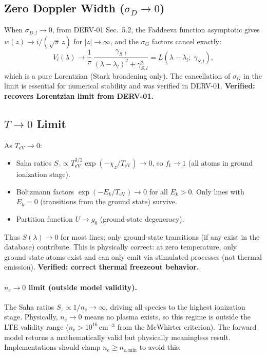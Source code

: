 \documentclass[11pt]{article}
\newcommand{\TeV}{T_\mathrm{eV}}
\newcommand{\ne}{n_\mathrm{e}}
\newcommand{\wfn}{w}
\begin{document}
\subsection{Zero Doppler Width ($\sigma_D \to 0$)}

When $\sigma_{D,l} \to 0$, from DERV-01 Sec.~5.2, the Faddeeva function
asymptotic gives $\wfn(z) \to i/(\sqrt{\pi}\,z)$ for $|z| \to \infty$,
and the $\sigma_G$ factors cancel exactly:
\begin{equation}
  V_l(\lambda) \to \frac{1}{\pi}\,\frac{\gamma_{S,l}}{(\lambda - \lambda_l)^2 + \gamma_{S,l}^2}
  = L(\lambda - \lambda_l;\;\gamma_{S,l}),
\end{equation}
which is a pure Lorentzian (Stark broadening only). The cancellation of
$\sigma_G$ in the limit is essential for numerical stability and was verified
in DERV-01. \textbf{Verified: recovers Lorentzian limit from DERV-01.}

\subsection{$T \to 0$ Limit}

As $\TeV \to 0$:
\begin{itemize}
  \item Saha ratios $S_z \propto \TeV^{3/2} \exp(-\chi_z/\TeV) \to 0$,
    so $f_\mathrm{I} \to 1$ (all atoms in ground ionization stage).
  \item Boltzmann factors $\exp(-E_k/\TeV) \to 0$ for all $E_k > 0$.
    Only lines with $E_k = 0$ (transitions from the ground state) survive.
  \item Partition function $U \to g_0$ (ground-state degeneracy).
\end{itemize}
Thus $S(\lambda) \to 0$ for most lines; only ground-state transitions
(if any exist in the database) contribute. This is physically correct:
at zero temperature, only ground-state atoms exist and can only emit
via stimulated processes (not thermal emission).
\textbf{Verified: correct thermal freezeout behavior.}

\paragraph{$\ne \to 0$ limit (outside model validity).}
The Saha ratios $S_z \propto 1/\ne \to \infty$, driving all species to
the highest ionization stage. Physically, $\ne \to 0$ means no plasma
exists, so this regime is outside the LTE validity range
($\ne > 10^{16}$\,cm$^{-3}$ from the McWhirter criterion). The forward
model returns a mathematically valid but physically meaningless result.
Implementations should clamp $\ne \geq n_{e,\mathrm{min}}$ to avoid this.
\end{document}
